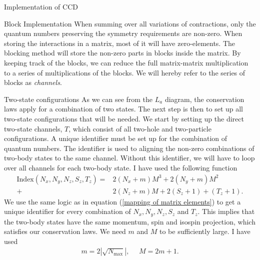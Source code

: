 \documentclass[twoside,english]{uiofysmaster}
\begin{document}
\begin{chapter}{Implementation of CCD}
\begin{section}{Block Implementation}
		When summing over all variations of contractions, only
                the quantum numbers preserving the symmetry
                requirements are non-zero. When storing the
                interactions in a matrix, most of it will have
                zero-elements. The blocking method will store the
                non-zero parts in blocks inside the matrix. By keeping
                track of the blocks, we can reduce the full
                matrix-matrix multiplication to a series of
                multiplications of the blocks. We will hereby refer to
                the series of blocks as \textit{channels}.

		\begin{subsection}{Two-state configurations}
			As we can see from the $L_a$ diagram, the
                        conservation laws apply for a combination of
                        two states. The next step is then to set up
                        all two-state configurations that will be
                        needed. We start by setting up the direct
                        two-state channels, $T$, which consist of all
                        two-hole and two-particle configurations. A
                        unique identifier must be set up for the
                        combination of quantum numbers. The identifier
                        is used to aligning the non-zero combinations
                        of two-body states to the same
                        channel. Without this identifier, we will have
                        to loop over all channels for each two-body
                        state. I have used the following function
			\begin{align}
				\text{Index}(N_x,N_y,N_z,S_z,T_z) = &2(N_x + m)M^3 + 2(N_y+m)M^2 \\+&  2(N_z+m)M + 2(S_z+1) + (T_z+1). \nonumber
			\end{align}
			We use the same logic as in equation
                        (\ref{mapping of matrix elements}) to get a
                        unique identifier for every combination of
                        $N_x,N_y,N_z,S_z$ and $T_z$. This implies that
                        the two-body states have the same momentum,
                        spin and isospin projection, which satisfies
                        our conservation laws. We need $m$ and $M$ to
                        be sufficiently large. I have used
			\begin{align}
				m = 2|\sqrt{N_{\text{max}}}|, \:\:\:\:\:\: M = 2m +1.
			\end{align}

\end{subsection}
\end{section}
\end{chapter}
\end{document}
